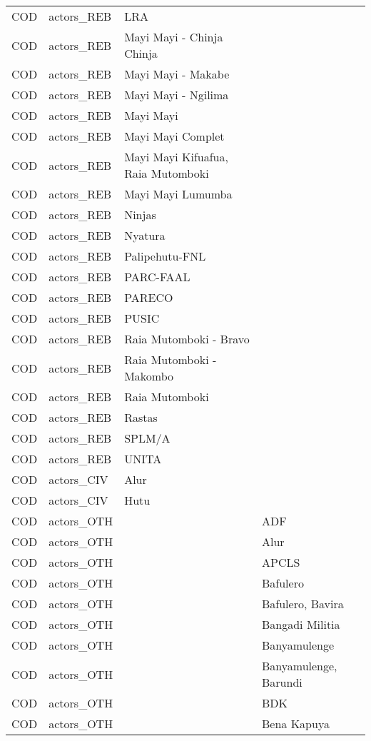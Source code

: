 \begin{table}[ht]
\begin{tabular}{llll}
  COD & actors\_REB & LRA &  \\ 
  COD & actors\_REB & Mayi Mayi - Chinja Chinja &  \\ 
  COD & actors\_REB & Mayi Mayi - Makabe &  \\ 
  COD & actors\_REB & Mayi Mayi - Ngilima &  \\ 
  COD & actors\_REB & Mayi Mayi &  \\ 
  COD & actors\_REB & Mayi Mayi Complet &  \\ 
  COD & actors\_REB & Mayi Mayi Kifuafua, Raia Mutomboki &  \\ 
  COD & actors\_REB & Mayi Mayi Lumumba &  \\ 
  COD & actors\_REB & Ninjas &  \\ 
  COD & actors\_REB & Nyatura &  \\ 
  COD & actors\_REB & Palipehutu-FNL &  \\ 
  COD & actors\_REB & PARC-FAAL &  \\ 
  COD & actors\_REB & PARECO &  \\ 
  COD & actors\_REB & PUSIC &  \\ 
  COD & actors\_REB & Raia Mutomboki - Bravo &  \\ 
  COD & actors\_REB & Raia Mutomboki - Makombo &  \\ 
  COD & actors\_REB & Raia Mutomboki &  \\ 
  COD & actors\_REB & Rastas &  \\ 
  COD & actors\_REB & SPLM/A &  \\ 
  COD & actors\_REB & UNITA &  \\ 
  COD & actors\_CIV & Alur &  \\ 
  COD & actors\_CIV & Hutu &  \\ 
  COD & actors\_OTH &  & ADF \\ 
  COD & actors\_OTH &  & Alur \\ 
  COD & actors\_OTH &  & APCLS \\ 
  COD & actors\_OTH &  & Bafulero \\ 
  COD & actors\_OTH &  & Bafulero, Bavira \\ 
  COD & actors\_OTH &  & Bangadi Militia \\ 
  COD & actors\_OTH &  & Banyamulenge \\ 
  COD & actors\_OTH &  & Banyamulenge, Barundi \\ 
  COD & actors\_OTH &  & BDK \\ 
  COD & actors\_OTH &  & Bena Kapuya \\ 

\end{tabular}
\end{table}
